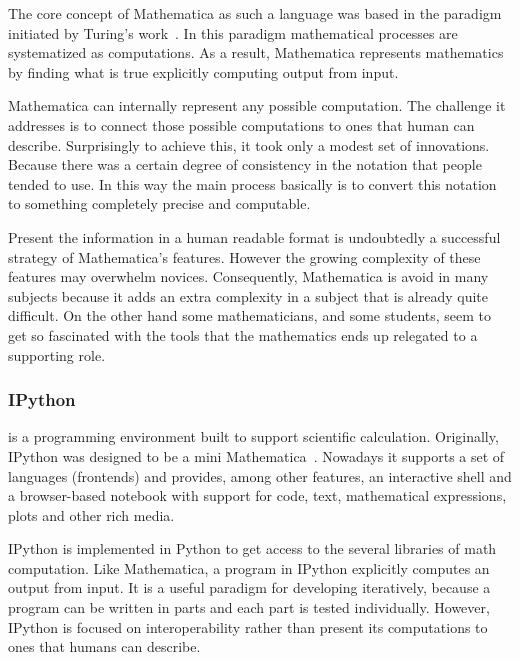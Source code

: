 The core concept of Mathematica as such a language was based in the paradigm initiated by Turing's work~\cite{wolfram2003wolfram}. In this paradigm mathematical processes are systematized as computations. As a result, Mathematica represents mathematics by finding what is true explicitly computing output from input. 

Mathematica can internally represent any possible computation. The challenge it addresses is to connect those possible computations to ones that human can describe. Surprisingly to achieve this, it took only a modest set of innovations. Because there was a certain degree of consistency in the notation that people tended to use. In this way the main process basically is to convert this notation to something completely precise and computable. 

Present the information in a human readable format is undoubtedly a successful strategy of Mathematica's features. However the growing complexity of these features may overwhelm novices. Consequently, Mathematica is avoid in many subjects because it adds an extra complexity in a subject that is already quite difficult. On the other hand some mathematicians, and some students, seem to get so fascinated with the tools that the mathematics ends up relegated to a supporting role.
\subsubsection{IPython~\cite{PER-GRA:2007}} is a programming environment built to support scientific calculation. Originally, IPython was designed to be a mini Mathematica~\cite{wolfram1991mathematica}. Nowadays it supports a set of languages (frontends) and provides, among other features, an interactive shell and a browser-based notebook with support for code, text, mathematical expressions, plots and other rich media. 

IPython is implemented in Python to get access to the several libraries of math computation. Like Mathematica, a program in IPython explicitly computes an output from input. It is a useful paradigm for developing iteratively, because a program can be written in parts and each part is tested individually. However, IPython is focused on interoperability rather than present its computations to ones that humans can describe.

